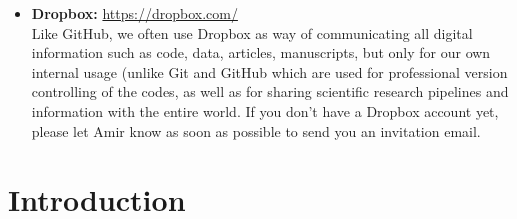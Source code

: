 \begin{itemize}
        \item
            {\bf Dropbox:} \url{https://dropbox.com/} \\
            Like GitHub, we often use Dropbox as way of communicating all digital information such as code, data, articles, manuscripts, but only for our own internal usage (unlike Git and GitHub which are used for professional version controlling of the codes, as well as for sharing scientific research pipelines and information with the entire world. If you don't have a Dropbox account yet, please let Amir know as soon as possible to send you an invitation email.

    \end{itemize}


\section{Introduction}
\label{sec:intro}
